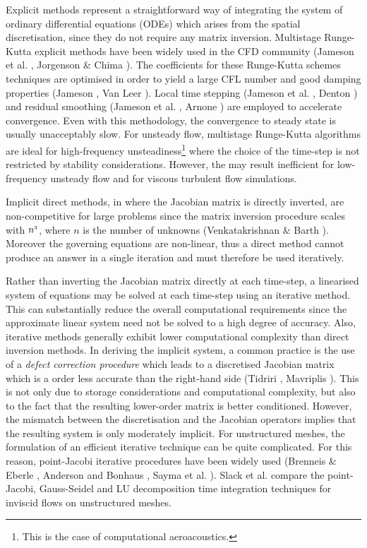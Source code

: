  Explicit methods represent a straightforward way of integrating the
 system of ordinary differential equations (ODEs) which arises from the
 spatial discretisation, since they do not require any matrix inversion.
 Multistage Runge-Kutta explicit methods
 have been widely used in the CFD community (Jameson et al. ,
 Jorgenson \& Chima ).
 The coefficients for these Runge-Kutta schemes techniques are optimised
 in order to yield a large CFL number and good damping properties
 (Jameson , Van Leer ).
 Local time stepping (Jameson et al. , Denton )
 and residual smoothing
 (Jameson et al. , Arnone )
 are employed to accelerate convergence.
 Even with this methodology, the convergence to steady state is usually
 unacceptably slow. For unsteady flow, multistage Runge-Kutta algorithms
 are ideal for high-frequency unsteadiness\footnote{This is the case
 of computational aeroacoustics.} where the choice of the time-step
 is not restricted by stability considerations.
 However, the may result inefficient for low-frequency unsteady flow
 and for viscous turbulent flow simulations.
 
 Implicit direct methods, in where the Jacobian matrix is directly inverted, are
 non-competitive for large problems since the matrix inversion procedure
 scales with $n^{\mbox{\tiny $3$}}$, where $n$ is the number of unknowns
 (Venkatakrishnan \& Barth ).
 Moreover the governing equations are non-linear, thus a direct method cannot produce
 an answer in a single iteration and must therefore be used iteratively.

 Rather than inverting the Jacobian matrix directly at each time-step, a
 linearised system of equations may be solved at each time-step using an iterative method.
 This can substantially reduce the overall computational requirements since the
 approximate linear system need not be solved to a high degree of accuracy.
 Also, iterative methods generally exhibit lower computational complexity than
 direct inversion methods.
 In deriving the implicit system, a common practice is the use of
 a {\em defect correction procedure} which leads to a discretised
 Jacobian matrix which is a order less accurate than
 the right-hand side (Tidriri ,
 Mavriplis ).
 This is not only due to storage considerations and computational complexity,
 but also to the fact that the resulting lower-order matrix is better conditioned.
 However, the mismatch between the discretisation and the Jacobian operators implies
 that the resulting system is only moderately implicit.
 For unstructured meshes, the formulation of an efficient iterative technique
 can be quite complicated. For this reason, point-Jacobi iterative procedures
 have been widely used (Brenneis \& Eberle ,
 Anderson and Bonhaus ,
 Sayma et al. ).
 Slack et al. \citeyear{Slack:1}  compare the point-Jacobi,
 Gauss-Seidel and LU decomposition time integration techniques for inviscid flows
 on unstructured meshes.

